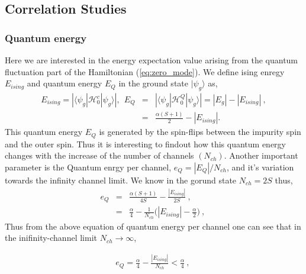 \documentclass[reprint,prb,superscriptaddress]{revtex4-1}
\begin{document}
\subsection{Correlation Studies}

\subsubsection{Quantum energy}
\noindent Here we are interested in the energy expectation value arising from the quantum fluctuation part of the Hamiltonian (\ref{eq:zero_mode}). We define ising enregy $E_{ising}$ and quantum energy $E_{Q}$ in the ground state $|\psi_g\rangle$ as,
\begin{eqnarray}
E_{ising} = |\langle \psi_g | \mathcal{H}^c_0 | \psi_g \rangle| ,~~ E_{Q} &=& |\langle \psi_g | \mathcal{H}^Q_0 | \psi_g \rangle|=|E_g|-|E_{ising}|~, \nonumber\\
&=& \frac{\alpha(S+1)}{2} - |E_{ising}|.
\end{eqnarray}  
This quantum energy $E_Q$ is generated by the spin-flips between the impurity spin and the outer spin. Thus it is interesting to findout how this quantum energy changes with the increase of the number of channels $(N_{ch})$. Another important parameter is the Quantum enrgy per channel, $e_Q=|E_Q|/N_{ch}$, and it's variation towards the infinity channel limit. We know in the gorund state $N_{ch}=2S$ thus,
\begin{eqnarray}
e_Q &=& \frac{\alpha(S+1)}{4S} - \frac{|E_{ising}|}{2S} ~,~\nonumber\\
&=& \frac{\alpha}{4} -\frac{1}{N_{ch}} \bigg(|E_{ising}| -\frac{\alpha}{2}  \bigg)~,~
\end{eqnarray}
Thus from the above equation of quantum energy per channel one can see that in the inifinity-channel limit $N_{ch}\rightarrow \infty$, 

\begin{eqnarray}
e_Q = \frac{\alpha}{4}- \frac{|E_{ising}|}{N_{ch}} < \frac{\alpha}{4}~,~
\end{eqnarray}
\end{document}
